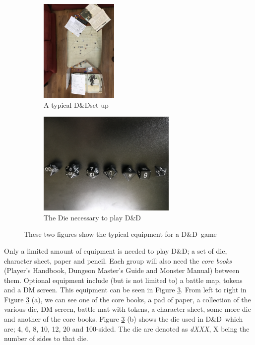\documentclass[progress]{cmpreport}
\newcommand{\dnd}{D\&D}
\begin{document}
	\begin{figure}[h] 
		\begin{subfigure}{0.5\textwidth}
			\includegraphics[width=1\linewidth, height=5cm, angle=180]{DnD_Live.jpg}
			\caption{A typical \dnd set up} 
			\label{DnDLive}
		\end{subfigure}
		\begin{subfigure}{0.5\textwidth}
			\includegraphics[width=1\linewidth, height=5cm, angle=180]{DnD_Dice.jpg}
			\caption{The Die necessary to play \dnd} 
			\label{DnDDice}
		\end{subfigure}
		\caption{These two figures show the typical equipment for a \dnd \ game}
		\label{DnDEquipmentExample}
	\end{figure}

	Only a limited amount of equipment is needed to play \dnd; a set of die, character sheet, paper and pencil. Each group will also need the \emph{core books} (Player's Handbook, Dungeon Master's Guide and Monster Manual) between them. Optional equipment include (but is not limited to) a battle map, tokens and a DM screen. This equipment can be seen in Figure \ref{DnDEquipmentExample}. From left to right in Figure \ref{DnDEquipmentExample} (a), we can see one of the core books, a pad of paper, a collection of the various die, DM screen, battle mat with tokens, a character sheet, some more die and another of the core books. Figure \ref{DnDEquipmentExample} (b) shows the die used in \dnd \ which are; 4, 6, 8, 10, 12, 20 and 100-sided. The die are denoted as \emph{dXXX}, X being the number of sides to that die. 
\end{document}
